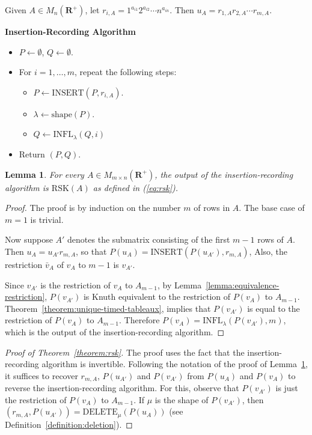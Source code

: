 \documentclass[10pt]{amsproc}
\newtheorem{lemma}[theorem]{Lemma}
\theoremstyle{definition}
\theoremstyle{remark}
\newcommand{\ins}{\mathrm{INSERT}}
\newcommand{\del}{\mathrm{DELETE}}
\newcommand{\shape}{\mathrm{shape}}
\newcommand{\rp}{\mathbf{R}^+}
\newcommand{\rsk}{\mathrm{RSK}}
\newcommand{\ot}{\leftarrow}
\newcommand{\infl}{\mathrm{INFL}}
\begin{document}
Given $A\in M_n(\rp)$, let $r_{i,A} = 1^{a_{i1}}2^{a_{i2}}\dotsb n^{a_{in}}$.
Then $u_A=r_{1,A}r_{2,A}\dotsb r_{m,A}$.
\begin{center}
  \textbf{Insertion-Recording Algorithm}
\end{center}
\begin{itemize}
\item $P\ot \emptyset$, $Q\ot \emptyset$.
\item For $i=1,\dotsc, m$, repeat the following steps:
  \begin{itemize}
  \item $P\ot \ins(P, r_{i,A})$.
  \item $\lambda \ot \shape(P)$.
  \item $Q\ot \infl_\lambda(Q,i)$
  \end{itemize}
\item Return $(P, Q)$.
\end{itemize}
\begin{lemma}
  \label{lemma:insertion-rec-algo}
  For every $A\in M_{m\times n}(\rp)$, the output of the insertion-recording algorithm is $\rsk(A)$ as defined in (\ref{eq:rsk}).
\end{lemma}
\begin{proof}
  The proof is by induction on the number $m$ of rows in $A$.
  The base case of $m=1$ is trivial.

  Now suppose $A'$ denotes the submatrix consisting of the first $m-1$ rows of $A$.
  Then $u_A = u_{A'}r_{m,A}$, so that $P(u_A)=\ins(P(u_{A'}),r_{m,A})$,
  Also, the restriction $\bar v_A$ of $v_A$ to $m-1$ is $v_{A'}$.
  
  Since $v_{A'}$ is the restriction of $v_A$ to $A_{m-1}$, by Lemma~\ref{lemma:equivalence-restriction}, $P(v_{A'})$ is Knuth equivalent to the restriction of $P(v_A)$ to $A_{m-1}$.
  Theorem~\ref{theorem:unique-timed-tableaux}, implies that $P(v_{A'})$ is equal to the restriction of $P(v_A)$ to $A_{m-1}$.
  Therefore $P(v_A)=\infl_\lambda(P(v_{A'}), m)$, which is the output of the insertion-recording algorithm.
\end{proof}
\begin{proof}
  [Proof of Theorem~\ref{theorem:rsk}]
  The proof uses the fact that the insertion-recording algorithm is invertible.
  Following the notation of the proof of Lemma~\ref{lemma:insertion-rec-algo}, it suffices to recover $r_{m,A}$, $P(u_{A'})$ and $P(v_{A'})$ from $P(u_A)$ and $P(v_A)$ to reverse the insertion-recording algorithm.
  For this, observe that $P(v_{A'})$ is just the restriction of $P(v_A)$ to $A_{m-1}$.
  If $\mu$ is the shape of $P(v_{A'})$, then $(r_{m,A},P(u_{A'}))=\del_\mu(P(u_A))$ (see Definition~\ref{definition:deletion}).
\end{proof}
\end{document}
